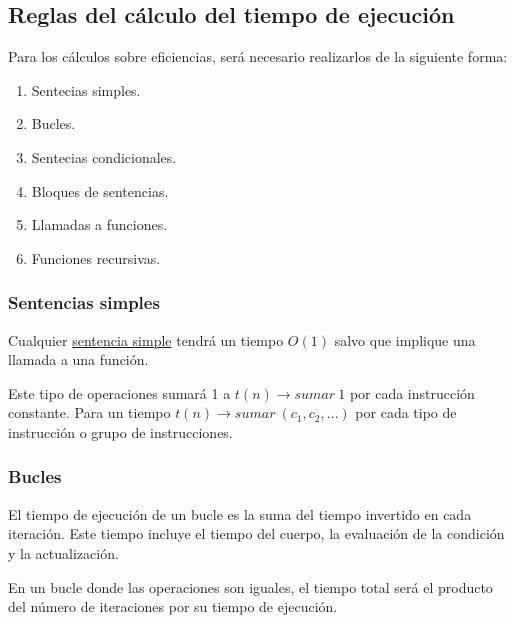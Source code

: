\documentclass[10pt,a4paper,spanish]{report}
\theoremstyle{definition}
\theoremstyle{remark}
\begin{document}
    \subsection{\textcolor{YellowOrange}Reglas del cálculo del tiempo de ejecución}

    Para los cálculos sobre eficiencias, será necesario realizarlos de la siguiente forma:

    \begin{enumerate}[$\spadesuit$]
        \item Sentecias simples.
        \item Bucles.
        \item Sentecias condicionales.
        \item Bloques de sentencias.
        \item Llamadas a funciones.
        \item Funciones recursivas.
    \end{enumerate}

    \subsubsection{\textcolor{YellowOrange}Sentencias simples}

    Cualquier \hyperref[ops_simples]{sentencia simple} tendrá un tiempo $O(1)$ salvo que implique una llamada a una función.

    Este tipo de operaciones sumará 1 a $t(n) \rightarrow sumar~1$ por cada instrucción constante. Para un tiempo $t(n) \rightarrow sumar~(c_1, c_2,\ldots)$ por cada tipo de instrucción o grupo de instrucciones.

    \subsubsection{\textcolor{YellowOrange}Bucles}

    El tiempo de ejecución de un bucle es la suma del tiempo invertido en cada iteración. Este tiempo incluye el tiempo del cuerpo, la evaluación de la condición y la actualización.

    En un bucle donde las operaciones son iguales, el tiempo total será el producto del número de iteraciones por su tiempo de ejecución.
\end{document}
